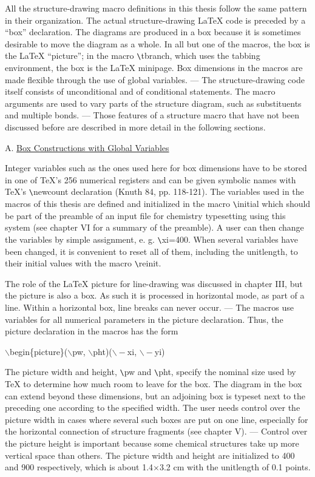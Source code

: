  All the structure-drawing macro definitions in this thesis
 follow the same pattern in their organization. The actual
 structure-drawing LaTeX code is preceded by a ``box''
 declaration.    
 The diagrams are produced in a box because it is sometimes
 desirable to move the diagram as a whole.
 In all but one of the macros, the box is the LaTeX
 ``picture''; in the macro \verb+\+tbranch,
 which uses the tabbing environment, the box is
 the LaTeX minipage. Box dimensions in the
 macros are made flexible through the use of global variables.
 --- The structure-drawing code itself consists of unconditional    
 and of conditional statements.  The macro arguments are used to
 vary parts of the structure diagram, such as substituents
 and multiple bonds. --- Those features of a structure macro
 that have not been discussed before are described in more
 detail in the following sections.

 \vspace{0.4cm}
 \noindent A. \underline{Box Constructions with Global Variables}
  
 Integer variables such as the ones used here for box dimensions
 have to be stored in one of TeX's 256 numerical registers and can
 be given symbolic names with TeX's \verb+\+newcount declaration
 (Knuth 84, pp. 118-121). The variables used in the macros of
 this thesis are defined and initialized in the macro          
 \verb+\+initial which should be part of the preamble of an input
 file for chemistry typesetting using this system (see chapter VI
 for a summary of the preamble). A user can then change the 
 variables by simple assignment, e. g. \verb+\+xi=400.
 When several variables have been changed, it is convenient to
 reset all of them, including the unitlength, to their initial
 values with the macro \verb+\+reinit.

 The role of the LaTeX picture for line-drawing was discussed
 in chapter III, but the picture is also a box.
 As such it is processed in horizontal mode, as part of a line.
 Within a horizontal box, line breaks can never occur. --- 
 The macros use variables for all numerical 
 parameters in the picture declaration.
 Thus, the picture declaration in the macros has the form \\
 \centerline{$\backslash $begin\{picture\}($\backslash $pw,
 $\backslash $pht)($\backslash -$xi, $\backslash -$yi)  }
 The picture width and height, \verb+\+pw and \verb+\+pht,
 specify the nominal size used by TeX to determine how much
 room to leave for the box. The diagram in the box can extend
 beyond these dimensions, but an adjoining box is typeset next
 to the preceding one according to the specified width.
 The user needs control over the picture width in cases where
 several such boxes are put on one line, especially for the
 horizontal connection of structure fragments (see chapter V).
 --- Control over the picture height is important because
 some chemical structures take up more vertical space than
 others. The picture width and height are initialized to 400
 and 900 respectively, which is about 1.4$\times $3.2 cm with
 the unitlength of 0.1 points.
 
